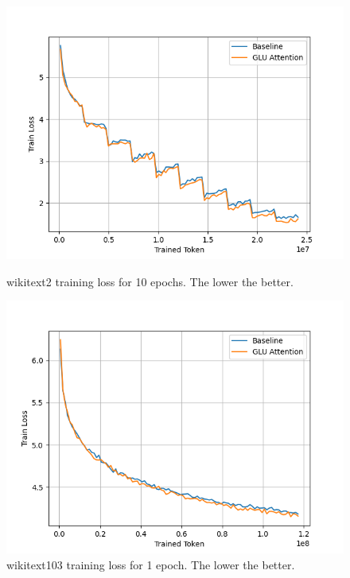 \documentclass[11pt]{article}
\begin{document}
\begin{figure}[htbp]
    \centering
    \begin{minipage}{0.49\textwidth}
        \centering
        \includegraphics[width=\textwidth]{wikitext2_train_loss.png}
        \caption{wikitext2 training loss for 10 epochs. The lower the better.}
        \label{fig:wikitext2_train_loss}
    \end{minipage}
    \begin{minipage}{0.49\textwidth}
        \centering
        \includegraphics[width=\textwidth]{wikitext103_train_loss.png}
        \caption{wikitext103 training loss for 1 epoch. The lower the better.}
        \label{fig:wikitext103_train_loss}
    \end{minipage}
    \hfill
\end{figure}
\end{document}
